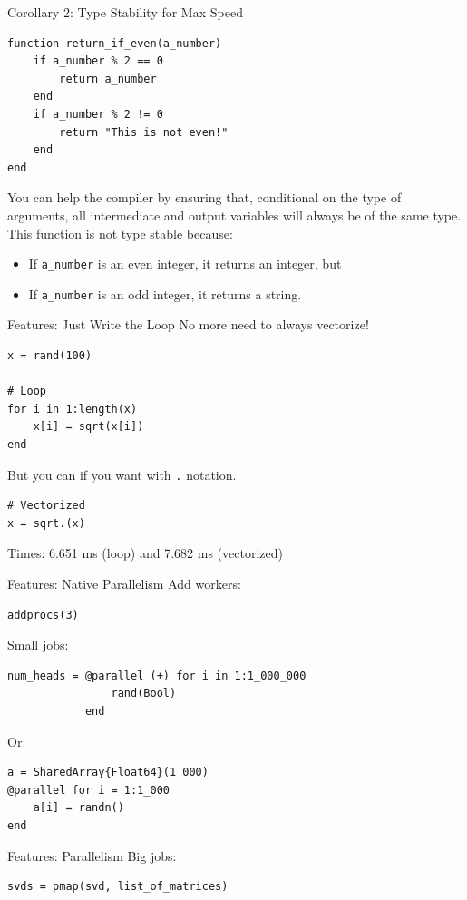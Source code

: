 \documentclass[11pt]{beamer}
\begin{document}
\begin{frame}[fragile]{Corollary 2: Type Stability for Max Speed}

\begin{verbatim}
function return_if_even(a_number)
    if a_number % 2 == 0
        return a_number
    end
    if a_number % 2 != 0
        return "This is not even!"
    end
end
\end{verbatim}
You can help the compiler by ensuring that, \alert{conditional on the type of arguments}, all intermediate and output variables will always be of the same type.\\
This function is \alert{not} type stable because:
\begin{itemize}
    \item If \texttt{a\_number} is an even integer, it returns an integer, but
    \item If \texttt{a\_number} is an odd integer, it returns a string.
\end{itemize}
\end{frame}


\begin{frame}[fragile]{Features: Just Write the Loop}
No more need to always vectorize!
\begin{verbatim}
x = rand(100)

# Loop
for i in 1:length(x)
    x[i] = sqrt(x[i])
end
\end{verbatim}
But you can if you want with \texttt{.} notation.
\begin{verbatim}
# Vectorized
x = sqrt.(x)
\end{verbatim}
Times: 6.651 ms (loop) and 7.682 ms (vectorized)
\end{frame}

\begin{frame}[fragile]{Features: Native Parallelism}
Add workers:
\begin{verbatim}
addprocs(3)
\end{verbatim}
Small jobs:
\begin{verbatim}
num_heads = @parallel (+) for i in 1:1_000_000
                rand(Bool)
            end
\end{verbatim}
\pause
Or:
\begin{verbatim}
a = SharedArray{Float64}(1_000)
@parallel for i = 1:1_000
    a[i] = randn()
end
\end{verbatim}
\end{frame}


\begin{frame}[fragile]{Features: Parallelism}
Big jobs:
\begin{verbatim}
svds = pmap(svd, list_of_matrices)
\end{verbatim}
\end{frame}
\end{document}
